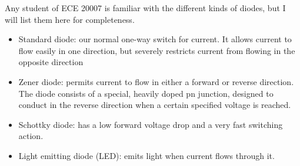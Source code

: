 \documentclass[nobib]{tufte-handout}
\begin{document}
Any student of ECE 20007 is familiar with the different kinds of diodes, but 
I will list them here for completeness. 
\begin{itemize}
    \item Standard diode: our normal one-way switch for current. 
    It allows current to flow easily in one direction, 
    but severely restricts current from flowing in the opposite direction
    \item Zener diode: permits current to flow in either a forward or 
    reverse direction. The diode consists of a special, heavily doped 
    pn junction, designed to conduct in the reverse direction when a 
    certain specified voltage is reached.
    \item Schottky diode: has a low forward voltage drop and a very fast switching action. 
    \item Light emitting diode (LED): emits light when current flows through it.
\end{itemize}
\end{document}
